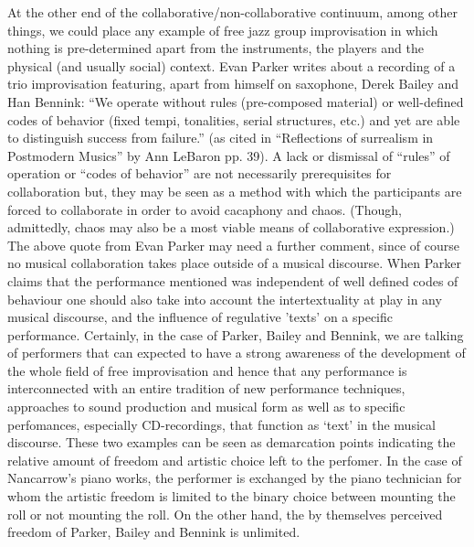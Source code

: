 At the other end of the collaborative/non-collaborative continuum,
among other things, we could place any example of free jazz group
improvisation in which nothing is pre-determined apart from the
instruments, the players and the physical (and usually social)
context. Evan Parker writes about a recording of a trio improvisation
featuring, apart from himself on saxophone, Derek Bailey and Han
Bennink: ``We operate without rules (pre-composed material) or
well-defined codes of behavior (fixed tempi, tonalities, serial
structures, etc.) and yet are able to distinguish success from
failure.'' (as cited in ``Reflections of surrealism in Postmodern
Musics'' by Ann LeBaron pp. 39). A lack or dismissal of ``rules'' of
operation or ``codes of behavior'' are not necessarily prerequisites
for collaboration but, they may be seen as a method with which the
participants are forced to collaborate in order to avoid cacaphony and
chaos. (Though, admittedly, chaos may also be a most viable means of
collaborative expression.) The above quote from Evan Parker may need a
further comment, since of course no musical collaboration takes place
outside of a musical discourse. When Parker claims that the
performance mentioned was independent of well defined codes of
behaviour one should also take into account the intertextuality at
play in any musical discourse, and the influence of regulative 'texts'
on a specific performance. Certainly, in the case of Parker, Bailey
and Bennink, we are talking of performers that can expected to have a
strong awareness of the development of the whole field of free
improvisation and hence that any performance is interconnected with an
entire tradition of new performance techniques, approaches to sound
production and musical form as well as to specific perfomances,
especially CD-recordings, that function as `text' in the musical
discourse. These two examples can be seen as demarcation points
indicating the relative amount of freedom and artistic choice left to
the perfomer. In the case of Nancarrow's piano works, the performer is
exchanged by the piano technician for whom the artistic freedom is
limited to the binary choice between mounting the roll or not mounting
the roll. On the other hand, the by themselves perceived freedom of
Parker, Bailey and Bennink is unlimited.
 
